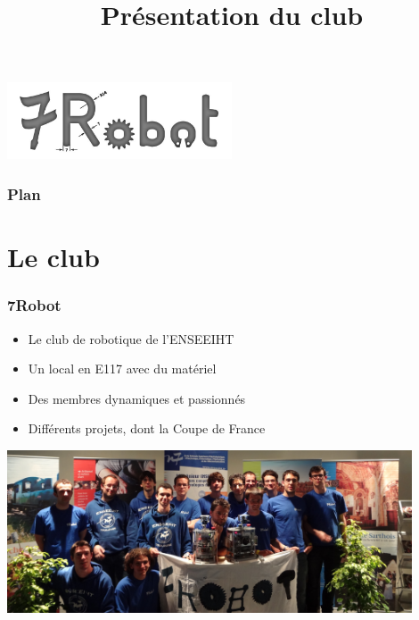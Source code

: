 \documentclass[9pt]{beamer}
\title[7Robot \hspace{0.1cm}Présentation du club]{Présentation du club}
\institute{ ENSEEIHT}
\begin{document}


\begin{frame}
	\frametitle{}
	
	\begin{center}
		\includegraphics[width=0.5\textwidth]{logo}
	\end{center}
	
	\vspace{-1.2cm}
	
	\titlepage
	
\end{frame}

{
  \begin{frame}
    \frametitle{Plan}
  \end{frame}
}


\section[Le club]{Le club}

\begin{frame}
	\frametitle{7Robot}
	\begin{itemize}
		\item Le club de robotique de l'ENSEEIHT
		\item Un local en E117 avec du matériel
		\item Des membres dynamiques et passionnés
		\item Différents projets, dont la Coupe de France		
	\end{itemize}
	
	
	\begin{center}
		\includegraphics[width=0.90\textwidth]{groupe}
	\end{center}

\end{frame}
\end{document}
